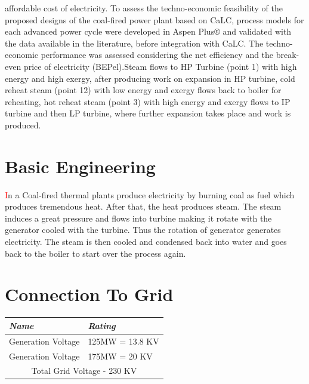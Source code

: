 \documentclass[11 pt]{article}
\begin{document}
affordable cost of electricity. To assess the techno-economic feasibility of the proposed designs of the coal-fired power plant based on CaLC, process models for each advanced power cycle were developed in Aspen Plus® and validated with the data available in the literature, before integration with CaLC. The techno-economic performance was assessed considering the net efficiency and the break-even price of electricity (BEPel).Steam flows to HP Turbine (point 1) with high energy and high exergy, after producing work on expansion in HP turbine, cold reheat steam (point 12) with low energy and exergy flows back to boiler for reheating, hot reheat steam (point 3) with high energy and exergy flows to IP turbine and then LP turbine, where further expansion takes place and work is produced.

\section{Basic Engineering}
{\huge\textcolor{red}{\hspace{5 mm}I}}n a Coal-fired thermal plants produce electricity by burning coal as fuel which produces tremendous heat. After that, the heat produces steam. The steam induces a great pressure and flows into turbine  making it rotate with the generator cooled with the turbine. Thus the rotation of generator generates electricity. The steam is then cooled and condensed back into water and goes back to the boiler to start over the process again.

\pagebreak

\section{Connection To Grid}
	\begin{longtable}{|| m{10 em} | m{10 em} ||}
		\hline\hline
		\rowcolor{teal!20}
			\hline
			\rowcolor{green!70}
			\textbf{\textit{Name}} & \textbf{\textit{Rating}} \\
			\hline\hline
			Generation Voltage & 125MW = 13.8 KV \\
			\hline
			Generation Voltage & 175MW = 20 KV \\
			\hline
			\multicolumn{2}{c}{Total Grid Voltage - 230 KV} \\
			\hline\hline
	\end{longtable}
\end{document}
